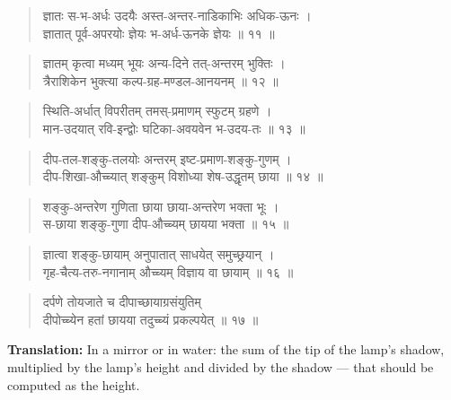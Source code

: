 \documentclass[11pt,a4paper]{article}
\newenvironment{shloka}{\begin{verse}\devanagarifont\large}{\end{verse}}
\begin{document}
\vspace{0.3cm}

\begin{shloka}
ज्ञातः स-भ-अर्धः उदयैः अस्त-अन्तर-नाडिकाभिः अधिक-ऊनः ।\\
ज्ञातात् पूर्व-अपरयोः ज्ञेयः भ-अर्ध-ऊनके ज्ञेयः ॥ ११ ॥
\end{shloka}

\vspace{0.3cm}

\begin{shloka}
ज्ञातम् कृत्वा मध्यम् भूयः अन्य-दिने तत्-अन्तरम् भुक्तिः ।\\
त्रैराशिकेन भुक्त्या कल्प-ग्रह-मण्डल-आनयनम् ॥ १२ ॥
\end{shloka}

\vspace{0.3cm}

\begin{shloka}
स्थिति-अर्धात् विपरीतम् तमस्-प्रमाणम् स्फुटम् ग्रहणे ।\\
मान-उदयात् रवि-इन्द्वोः घटिका-अवयवेन भ-उदय-तः ॥ १३ ॥
\end{shloka}

\vspace{0.3cm}

\begin{shloka}
दीप-तल-शङ्कु-तलयोः अन्तरम् इष्ट-प्रमाण-शङ्कु-गुणम् ।\\
दीप-शिखा-औच्च्यात् शङ्कुम् विशोध्या शेष-उद्धृतम् छाया ॥ १४ ॥
\end{shloka}

\begin{shloka}
शङ्कु-अन्तरेण गुणिता छाया छाया-अन्तरेण भक्ता भूः ।\\
स-छाया शङ्कु-गुणा दीप-औच्च्यम् छायया भक्ता ॥ १५ ॥
\end{shloka}

\begin{shloka}
ज्ञात्वा शङ्कु-छायाम् अनुपातात् साधयेत् समुच्छ्रयान् ।\\
गृह-चैत्य-तरु-नगानाम् औच्च्यम् विज्ञाय वा छायाम् ॥ १६ ॥
\end{shloka}

\vspace{0.5cm}

\begin{shloka}
दर्पणे तोयजाते च दीपाच्छायाग्रसंयुतिम् \\
दीपोच्च्येन हतां छायया तदुच्च्यं प्रकल्पयेत् ॥ १७ ॥
\end{shloka}

\textbf{Translation:}\quad
In a mirror or in water: the sum of the tip of the lamp's shadow,
multiplied by the lamp's height and divided by the shadow — that
should be computed as the height.
\end{document}
